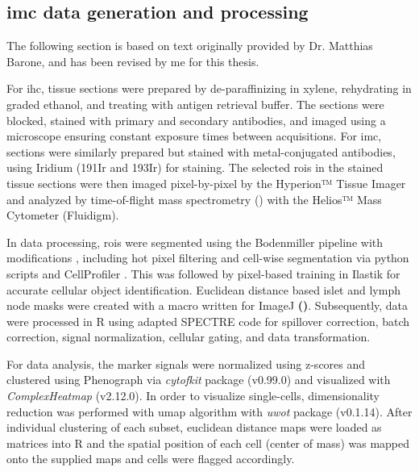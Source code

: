 \subsection[\glslink{imc}{IMC} data generation and processing]{\large \gls{imc} data generation and processing}
\vspace{3mm}
\begin{Comment2}
\vspace{1mm}
\hspace{-3mm}
The following section is based on text originally provided by Dr. Matthias Barone, and has been revised by me for this thesis.
\vspace{1mm}
\end{Comment2}
\vspace{3mm}
For \acrfull{ihc}, tissue sections were prepared by de-paraffinizing in xylene, rehydrating in graded ethanol, and treating with antigen retrieval buffer. The sections were blocked, stained with primary and secondary antibodies, and imaged using a microscope ensuring constant exposure times between acquisitions. For \gls{imc}, sections were similarly prepared but stained with metal-conjugated antibodies, using Iridium (191Ir and 193Ir) for  staining. The selected  \glspl{roi} in the stained tissue sections were then imaged pixel-by-pixel by the Hyperion™ Tissue Imager and analyzed by time-of-flight mass spectrometry () with the Helios™ Mass Cytometer (Fluidigm).\\
\par In data processing, \glspl{roi} were segmented using the Bodenmiller pipeline with modifications \textbf{\cite{eling_imc_2022}}, including hot pixel filtering and cell-wise segmentation via python scripts and CellProfiler \textbf{\cite{carpenter_cellprofiler_2006,mcquin_cellprofiler_2018}}. This was followed by pixel-based training in Ilastik \textbf{\cite{berg_ilastik_2019}} for accurate cellular object identification. Euclidean distance based islet and lymph node masks were created with a macro written for ImageJ \textbf{(\cite{schneider_nih_2012})}. Subsequently, data were processed in R using adapted SPECTRE \textbf{\cite{ashhurst_integration_2022}} code for spillover correction, batch correction, signal normalization, cellular gating, and data transformation.\\
\par For data analysis, the marker signals were normalized using z-scores and clustered using Phenograph via \textit{cytofkit} package (v0.99.0) and visualized with \textit{ComplexHeatmap} (v2.12.0). In order to visualize single-cells, dimensionality reduction was performed with \gls{umap} algorithm with \textit{uwot} package (v0.1.14). After individual clustering of each subset, euclidean distance maps were loaded as matrices into R and the spatial position of each cell (center of mass) was mapped onto the supplied maps and cells were flagged accordingly.


